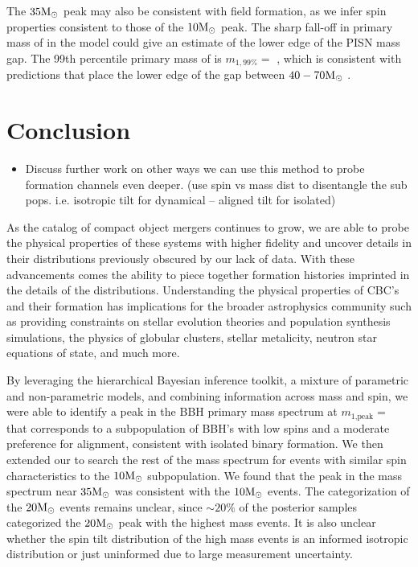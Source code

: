 The $35{\rm M}_\odot$ peak may also be consistent with field formation, as we infer spin properties consistent to those of the $10{\rm M}_\odot$ peak. The sharp fall-off in primary mass of \contA{} in the \comp{} model could give an estimate of the lower edge of the PISN mass gap. The 99th percentile primary mass of \contA{} is $m_{1,99\%} = $ \result{$\CIPlusMinus{\macros[Mass][Composite][ContinuumA][99percentile]}$}, which is consistent with predictions that place the lower edge of the gap between $40-70{\rm M}_\odot$ \citep{1901.00215,2103.07933v1,1910.12874v1,2104.07783v2}. 



\section{Conclusion} \label{sec:conclusion}

\begin{itemize}
    \item Discuss further work on other ways we can use this method to probe formation channels even deeper. (use spin vs mass dist to disentangle the sub pops. i.e. isotropic tilt for dynamical -- aligned tilt for isolated)
\end{itemize}

As the catalog of compact object mergers continues to grow, we are able to probe the physical properties of these systems with higher fidelity and uncover details in their distributions previously obscured by our lack of data. With these advancements comes the ability to piece together formation histories imprinted in the details of the distributions. Understanding the physical properties of CBC's and their formation has implications for the broader astrophysics community such as providing constraints on stellar evolution theories and population synthesis simulations, the physics of globular clusters, stellar metalicity, neutron star equations of state, and much more. 

By leveraging the hierarchical Bayesian inference toolkit, a mixture of parametric and non-parametric models, and combining information across mass and spin, we were able to identify a peak in the BBH primary mass spectrum at $m_\text{1,peak} = $ \result{$\CIPlusMinus{\macros[Mass][Base][PeakA][max]}$} that corresponds to a subpopulation of BBH's with low spins and a moderate preference for alignment, consistent with isolated binary formation. We then extended our \base{} to search the rest of the mass spectrum for events with similar spin characteristics to the $10{\rm M}_\odot$ subpopulation. We found that the peak in the mass spectrum near $35{\rm M}_\odot$ was consistent with the $10{\rm M}_\odot$ events. The categorization of the $20{\rm M}_\odot$ events remains unclear, since $\sim20\%$ of the posterior samples categorized the $20{\rm M}_\odot$ peak with the highest mass events. It is also unclear whether the spin tilt distribution of the high mass events is an informed isotropic distribution or just uninformed due to large measurement uncertainty. 

